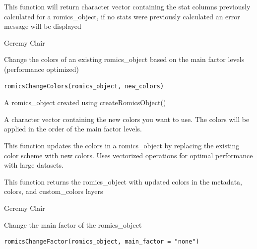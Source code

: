\documentclass[a4paper]{book}
\begin{document}
%
\begin{Value}
This function will return character vector containing the stat columns previously calculated for a romics\_object, if no stats were previously calculated an error message will be displayed
\end{Value}
%
\begin{Author}
Geremy Clair
\end{Author}
%
\begin{Description}
Change the colors of an existing romics\_object based on the main factor levels (performance optimized)
\end{Description}
%
\begin{Usage}
\begin{verbatim}
romicsChangeColors(romics_object, new_colors)
\end{verbatim}
\end{Usage}
%
\begin{Arguments}
\begin{ldescription}
\item[\code{romics\_object}] A romics\_object created using createRomicsObject()

\item[\code{new\_colors}] A character vector containing the new colors you want to use. The colors will be applied in the order of the main factor levels.
\end{ldescription}
\end{Arguments}
%
\begin{Details}
This function updates the colors in a romics\_object by replacing the existing color scheme with new colors. Uses vectorized operations for optimal performance with large datasets.
\end{Details}
%
\begin{Value}
This function returns the romics\_object with updated colors in the metadata, colors, and custom\_colors layers
\end{Value}
%
\begin{Author}
Geremy Clair
\end{Author}
%
\begin{Description}
Change the main factor of the romics\_object
\end{Description}
%
\begin{Usage}
\begin{verbatim}
romicsChangeFactor(romics_object, main_factor = "none")
\end{verbatim}
\end{Usage}
\end{document}
